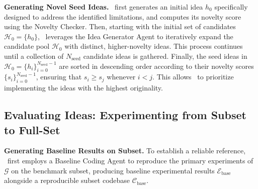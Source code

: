 \noindent\textbf{Generating Novel Seed Ideas.} \sname~first generates an initial idea $h_0$ specifically designed to address the identified limitations, and computes its novelty score using the Novelty Checker. Then, starting with the initial set of candidates $\mathcal{H}_0 = \{h_0\}$, \sname~leverages the Idea Generator Agent to iteratively expand the candidate pool $\mathcal{H}_0$ with distinct, higher-novelty ideas.
This process continues until a collection of $N_{\mathrm{seed}}$ candidate ideas is gathered. 
Finally, the seed ideas in $\mathcal{H}_0= \{h_i\}_{i=0}^{N_\mathrm{seed}-1}$ are sorted in descending order according to their novelty scores $\{s_i\}_{i=0}^{N_{\mathrm{seed}}-1}$, ensuring that $s_i \ge s_j$ whenever $i < j$.
This allows \sname~to prioritize implementing the ideas with the highest originality.

\subsection{Evaluating Ideas: Experimenting from Subset to Full-Set}\label{subsec:eval_idea}


\noindent\textbf{Generating Baseline Results on Subset.}
To establish a reliable reference, \sname~first employs a Baseline Coding Agent to reproduce the primary experiments of $\mathcal{G}$ on the benchmark subset, producing baseline experimental results $\mathcal{E}_{\mathrm{base}}$ alongside a reproducible subset codebase $\mathcal{C}_{\mathrm{base}}$.

